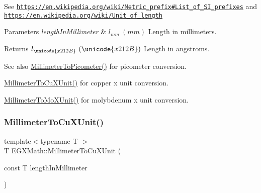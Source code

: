 See \href{https://en.wikipedia.org/wiki/Metric_prefix#List_of_SI_prefixes}{\tt https\+://en.\+wikipedia.\+org/wiki/\+Metric\+\_\+prefix\#\+List\+\_\+of\+\_\+\+S\+I\+\_\+prefixes} and \href{https://en.wikipedia.org/wiki/Unit_of_length}{\tt https\+://en.\+wikipedia.\+org/wiki/\+Unit\+\_\+of\+\_\+length} 
\begin{DoxyParams}{Parameters}
{\em length\+In\+Millimeter} & $ l_{mm}\ (mm)$ Length in millimeters. \\
\hline
\end{DoxyParams}
\begin{DoxyReturn}{Returns}
$ l_{\unicode{x212B}}\ (\unicode{x212B})$ Length in angstroms. 
\end{DoxyReturn}
\begin{DoxySeeAlso}{See also}
\mbox{\hyperlink{group___e_g_x_math-_conversions-_length_conversions-_millimeter-_s_i_ga679e3714c229f1355a5c9bf707fcd723}{Millimeter\+To\+Picometer()}} for picometer conversion. 

\mbox{\hyperlink{group___e_g_x_math-_conversions-_length_conversions-_millimeter-_non-_s_i_gaa9a94e1f42047955530f673047c4370b}{Millimeter\+To\+Cu\+X\+Unit()}} for copper x unit conversion. 

\mbox{\hyperlink{group___e_g_x_math-_conversions-_length_conversions-_millimeter-_non-_s_i_ga1f0be98bc702f46a69579b27e05a2439}{Millimeter\+To\+Mo\+X\+Unit()}} for molybdenum x unit conversion. 
\end{DoxySeeAlso}
\mbox{\label{group___e_g_x_math-_conversions-_length_conversions-_millimeter-_non-_s_i_gaa9a94e1f42047955530f673047c4370b}} 
\subsubsection{\texorpdfstring{Millimeter\+To\+Cu\+X\+Unit()}{MillimeterToCuXUnit()}}
{\footnotesize\ttfamily template$<$typename T $>$ \\
T E\+G\+X\+Math\+::\+Millimeter\+To\+Cu\+X\+Unit (\begin{DoxyParamCaption}\item[{const T}]{length\+In\+Millimeter }\end{DoxyParamCaption})}



